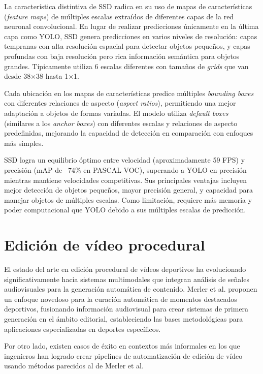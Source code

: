 \begin{description}
	La característica distintiva de SSD radica en su uso de mapas de características (\textit{feature maps}) de múltiples escalas extraídos de diferentes capas de la red neuronal convolucional. En lugar de realizar predicciones únicamente en la última capa como YOLO, SSD genera predicciones en varios niveles de resolución: capas tempranas con alta resolución espacial para detectar objetos pequeños, y capas profundas con baja resolución pero rica información semántica para objetos grandes. Típicamente utiliza 6 escalas diferentes con tamaños de \textit{grids} que van desde 38×38 hasta 1×1.
	
	Cada ubicación en los mapas de características predice múltiples \textit{bounding boxes} con diferentes relaciones de aspecto (\textit{aspect ratios}), permitiendo una mejor adaptación a objetos de formas variadas. El modelo utiliza \textit{default boxes} (similares a los \textit{anchor boxes}) con diferentes escalas y relaciones de aspecto predefinidas, mejorando la capacidad de detección en comparación con enfoques más simples.
	
	SSD logra un equilibrio óptimo entre velocidad (aproximadamente 59 FPS) y precisión (mAP de ~74\% en PASCAL VOC), superando a YOLO en precisión mientras mantiene velocidades competitivas. Sus principales ventajas incluyen mejor detección de objetos pequeños, mayor precisión general, y capacidad para manejar objetos de múltiples escalas. Como limitación, requiere más memoria y poder computacional que YOLO debido a sus múltiples escalas de predicción.
\end{description}

\section[Edición de vídeo procedural]{Edición de vídeo procedural}

El estado del arte en edición procedural de vídeos deportivos ha evolucionado significativamente hacia sistemas multimodales que integran análisis de señales audiovisuales para la generación automática de contenido. Merler et al.\cite{merler2019} proponen un enfoque novedoso para la curación automática de momentos destacados deportivos, fusionando información audiovisual para crear sistemas de primera generación en el ámbito editorial, estableciendo las bases metodológicas para aplicaciones especializadas en deportes específicos.

Por otro lado, existen casos de éxito en contextos más informales en los que ingenieros han logrado crear pipelines de automatización de edición de vídeo \cite{mediumVideoEditingPython} usando métodos parecidos al de Merler et al.

